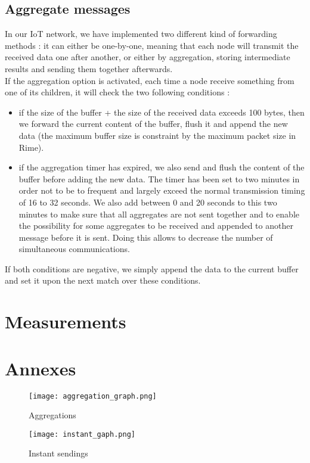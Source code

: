 \documentclass{article}
\begin{document}
\subsection{Aggregate messages}

In our IoT network, we have implemented two different kind of forwarding methods : it can either be one-by-one, meaning that each node will transmit the received data one after another, or either by aggregation, storing intermediate results and sending them together afterwards.\\
If the aggregation option is activated, each time a node receive something from one of its children, it will check the two following conditions :
\begin{itemize}
    \item if the size of the buffer + the size of the received data exceeds 100 bytes, then we forward the current content of the buffer, flush it and append the new data (the maximum buffer size is constraint by the maximum packet size in Rime).
    \item if the aggregation timer has expired, we also send and flush the content of the buffer before adding the new data. The timer has been set to two minutes in order not to be to frequent and largely exceed the normal transmission timing of 16 to 32 seconds. We also add between 0 and 20 seconds to this two minutes to make sure that all aggregates are not sent together and to enable the possibility for some aggregates to be received and appended to another message before it is sent. Doing this allows to decrease the number of simultaneous communications.
\end{itemize}
 If both conditions are negative, we simply append the data to the current buffer and set it upon the next match over these conditions.

\section{Measurements}

\section{Annexes}

\begin{center}
\begin{figure}[!h]
   \texttt{[image: aggregation\_graph.png]}
   \caption{\label{g1} Aggregations}
\end{figure}
\end{center}

\begin{figure}[!h]
   \texttt{[image: instant\_gaph.png]}
   \caption{\label{g2} Instant sendings}
\end{figure}
\end{document}
